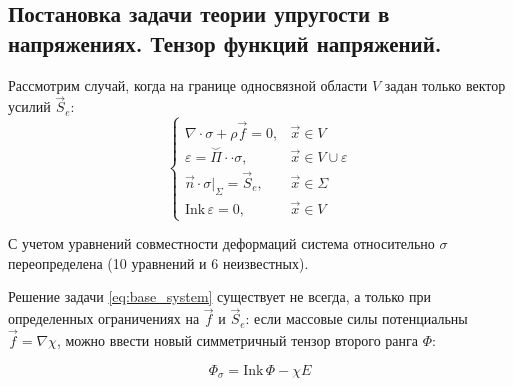 
\subsection*{Постановка задачи теории упругости в напряжениях. Тензор функций напряжений.}

Рассмотрим случай, когда на границе односвязной области \( V \) задан только вектор усилий \( \vec{S}_e \):
\begin{equation}\label{eq:base_system}
    \begin{cases}
        \nabla \cdot \sigma + \rho \vec{f} = 0, & \vec{x} \in V \\
        \varepsilon = \overset{\smallsmile}{\Pi} \cdot\cdot \sigma, & \vec{x} \in V \cup \varepsilon \\
        \vec{n} \cdot \sigma |_{\Sigma} = \vec{S}_e, & \vec{x} \in \Sigma \\
        \text{Ink} \, \varepsilon = 0, & \vec{x} \in V
    \end{cases}
\end{equation}




С учетом уравнений совместности деформаций система относительно $\sigma$ переопределена (10 уравнений и 6 неизвестных).

Решение задачи \eqref{eq:base_system} существует не всегда, а только при определенных ограничениях на \( \vec{f} \) и \( \vec{S}_e \): если массовые силы потенциальны $\vec{f} = \nabla \chi$, можно ввести новый симметричный тензор второго ранга \( \Phi \):

\begin{equation}\label{eq:phi_tensor}
    \Phi_{\sigma} = \text{Ink} \, \Phi - \chi E
\end{equation}

